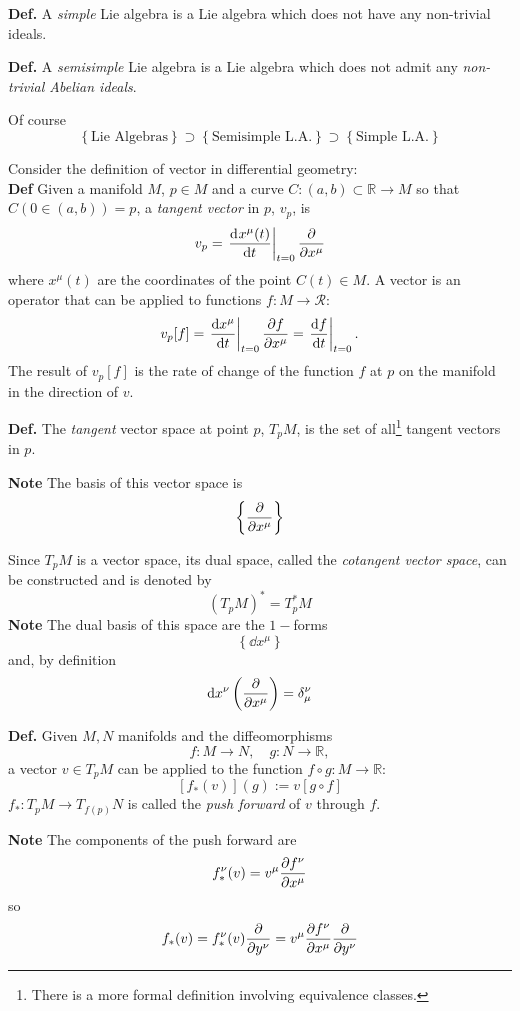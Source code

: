 \textbf{Def.} A \textit{simple} Lie algebra is a Lie algebra which does not have
any non-trivial ideals.

\textbf{Def.} A \textit{semisimple} Lie algebra is a Lie algebra which does not
admit any \textit{non-trivial Abelian ideals}.

Of course
$$\left\{\text{Lie Algebras}\right\}\supset\left\{\text{Semisimple L.A.}\right\}
\supset\left\{\text{Simple L.A.}\right\}$$

Consider the definition of vector in differential geometry:\\
\textbf{Def} Given a manifold $M$, $p\in M$ and a curve
$C:(a,b)\subset\mathbb{R}\to M$ so that $C(0\in(a,b))=p$, a
\textit{tangent vector} in $p$, $v_p$, is
$$v_p = \eval{\dv[]{x^\mu(t)}{t}}_{t=0}\pdv{}{x^\mu}$$
where $x^\mu(t)$ are the coordinates of the point $C(t)\in M$.
A vector is an operator that can be applied to functions $f:M\to\mathcal{R}$:
$$v_p[f] = \eval{\dv{x^\mu}{t}}_{t=0}\pdv{f}{x^\mu} = \eval{\dv{f}{t}}_{t=0}.$$
The result of $v_p[f]$ is the rate of change of the function $f$ at $p$ on the
manifold in the direction of $v$.

\textbf{Def.} The \textit{tangent} vector space at point $p$, $T_pM$, is
the set of all\footnote{There is a more formal definition involving equivalence
classes.} tangent vectors in $p$.

\textbf{Note} The basis of this vector space is
$$\left\{\pdv{}{x^\mu}\right\}$$

Since $T_pM$ is a vector space, its dual space, called the \textit{cotangent
vector space}, can be constructed and is denoted by
$$(T_pM)^*=T^*_pM$$
\textbf{Note} The dual basis of this space are the $1-$forms
$$\left\{\dd x^\mu\right\}$$
and, by definition
$$\dd x^\nu \left(\pdv{}{x^\mu}\right) = \delta^\nu_\mu$$

\textbf{Def.} Given $M,N$ manifolds and the diffeomorphisms
$$f:M\to N,\quad g:N\to\mathbb{R},$$
a vector $v\in T_pM$ can be applied to the function $f\circ g: M\to\mathbb{R}$:
$$\left[f_*(v)\right](g):= v[g\circ f] $$
$f_*:T_pM\to T_{f(p)}N$ is called the \textit{push forward} of $v$ through $f$.

\textbf{Note} The components of the push forward are
$$f_*^\nu(v) = v^\mu\pdv{f^\nu}{x^\mu}$$
so
$$f_*(v) = f_*^\nu(v)\pdv{}{y^\nu}= v^\mu\pdv{f^\nu}{x^\mu}\pdv{}{y^\nu}$$

